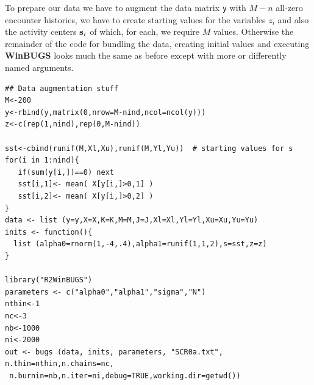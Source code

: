 To prepare our data we have to augment the data matrix \mbox{\tt y}
with $M-n$ all-zero encounter histories, we have to create starting
values for the variables $z_{i}$ and also the activity centers ${\bf
  s}_{i}$ of which, for each, we require $M$ values. Otherwise the
remainder of the code for bundling the data, creating initial values
and executing {\bf WinBUGS} looks much the same as before except with more
or differently named arguments.
{\small
\begin{verbatim}
## Data augmentation stuff
M<-200
y<-rbind(y,matrix(0,nrow=M-nind,ncol=ncol(y)))
z<-c(rep(1,nind),rep(0,M-nind))

sst<-cbind(runif(M,Xl,Xu),runif(M,Yl,Yu))  # starting values for s
for(i in 1:nind){
   if(sum(y[i,])==0) next
   sst[i,1]<- mean( X[y[i,]>0,1] )
   sst[i,2]<- mean( X[y[i,]>0,2] )
}
data <- list (y=y,X=X,K=K,M=M,J=J,Xl=Xl,Yl=Yl,Xu=Xu,Yu=Yu)
inits <- function(){
  list (alpha0=rnorm(1,-4,.4),alpha1=runif(1,1,2),s=sst,z=z)
}

library("R2WinBUGS")
parameters <- c("alpha0","alpha1","sigma","N")
nthin<-1
nc<-3
nb<-1000
ni<-2000
out <- bugs (data, inits, parameters, "SCR0a.txt", n.thin=nthin,n.chains=nc,
 n.burnin=nb,n.iter=ni,debug=TRUE,working.dir=getwd())
\end{verbatim}
}

